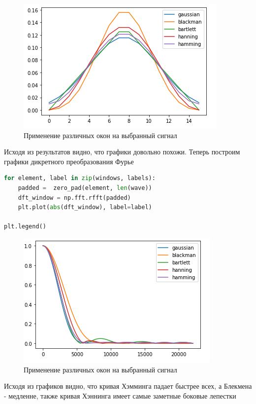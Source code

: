 \begin{figure}[H]
	\begin{center}
		\includegraphics[scale=1]{fig/lab08/lab08_07.png}
		\caption{Применение различных окон на выбранный сигнал}
	\end{center}
\end{figure}

Исходя из результатов видно, что графики довольно похожи. Теперь построим графики дикретного преобразования Фурье

\begin{lstlisting}[language=Python]
for element, label in zip(windows, labels):
    padded =  zero_pad(element, len(wave))
    dft_window = np.fft.rfft(padded)
    plt.plot(abs(dft_window), label=label)
    
plt.legend()
\end{lstlisting}

\begin{figure}[H]
	\begin{center}
		\includegraphics[scale=1]{fig/lab08/lab08_08.png}
		\caption{Применение различных окон на выбранный сигнал}
	\end{center}
\end{figure}

Исходя из графиков видно, что кривая Хэмминга падает быстрее всех, а Блекмена - медленне, также кривая Хэннинга имеет самые заметные боковые лепестки

